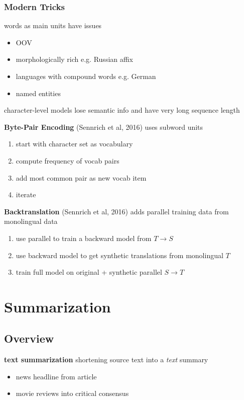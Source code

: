 \documentclass[]{article}
\theoremstyle{definition}
\begin{document}
\subsubsection{Modern Tricks}%
\label{ssub:modern_tricks}

words as main units have issues
\begin{itemize}
    \item OOV
    \item morphologically rich e.g. Russian affix
    \item languages with compound words e.g. German
    \item named entities
\end{itemize}

character-level models lose semantic info and have very long sequence length

\textbf{Byte-Pair Encoding} (Sennrich et al, 2016) uses subword units
\begin{enumerate}
    \item start with character set as vocabulary
    \item compute frequency of vocab pairs
    \item add most common pair as new vocab item
    \item iterate
\end{enumerate}

\textbf{Backtranslation} (Sennrich et al, 2016) adds parallel training data from monolingual data
\begin{enumerate}
    \item use parallel to train a backward model from $T \to S$
    \item use backward model to get synthetic translations from monolingual $T$
    \item train full model on original + synthetic parallel $S \to T$
\end{enumerate}






\section{Summarization}%
\label{sec:summarization}

\subsection{Overview}%
\label{sub:automatic_summarization}

\textbf{text summarization} shortening source text into a \textit{text} summary
\begin{itemize}
    \item news headline from article
    \item movie reviews into critical consensus
\end{itemize}
\end{document}
